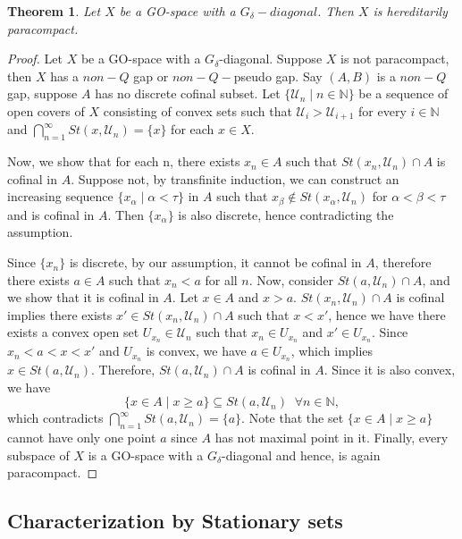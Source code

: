\documentclass[12pt,oneside,english]{amsbook}
\numberwithin{equation}{section} %
\numberwithin{figure}{section} %
\theoremstyle{plain}
\numberwithin{section}{chapter}
\newtheorem{thm}{Theorem}[section]
\theoremstyle{plain}
\begin{document}
\begin{thm}
  Let $X$ be a GO-space with a $G_{\delta}-diagonal$. Then $X$ is hereditarily paracompact.
\end{thm}
\begin{proof}
  Let $X$ be a GO-space with a $G_{\delta}$-diagonal. Suppose $X$ is not paracompact, then $X$ has a $non-Q$ gap or $non-Q-$pseudo gap. Say $(A,B)$ is a $non-Q$ gap, suppose $A$ has no discrete cofinal subset. Let $\{ \mathcal{U}_{n} \; | \; n \in \mathbb{N} \}$ be a sequence of open covers of $X$ consisting of convex sets such that $\mathcal{U}_{i} > \mathcal{U}_{i+1}$ for every $i \in \mathbb{N}$ and $\bigcap_{n = 1}^{\infty}St(x,\mathcal{U}_{n}) = \{x\}$ for each $x \in X$.

  Now, we show that for each n, there exists $x_{n} \in A$ such that $St(x_n,\mathcal{U}_{n}) \cap A$ is cofinal in $A$. Suppose not, by transfinite induction, we can construct an increasing sequence $\{x_{\alpha} \; | \; \alpha < \tau \}$ in $A$ such that $x_{\beta} \notin St(x_{\alpha},\mathcal{U}_{n})$ for $\alpha < \beta < \tau$ and is cofinal in $A$. Then $\{x_{\alpha}\}$ is also discrete, hence contradicting the assumption.

  Since $\{x_{n}\}$ is discrete, by our assumption, it cannot be cofinal in $A$, therefore there exists $a \in A$ such that $x_n < a$ for all $n$. Now, consider $St(a, \mathcal{U}_{n}) \cap A$, and we show that it is cofinal in $A$. Let $x \in A$ and $x > a$. $St(x_n, \mathcal{U}_{n}) \cap A$ is cofinal implies there exists $x' \in St(x_n, \mathcal{U}_{n}) \cap A$ such that $x < x'$, hence we have there exists a convex open set $U_{x_{n}} \in \mathcal{U}_{n}$ such that $x_n \in U_{x_{n}}$ and $x' \in U_{x_{n}}$. Since $x_{n} < a < x < x'$ and $U_{x_{n}}$ is convex, we have $a \in U_{x_{n}}$, which implies $x \in St(a, \mathcal{U}_{n})$. Therefore, $St(a, \mathcal{U}_{n}) \cap A$ is cofinal in $A$. Since it is also convex, we have $$ \{x \in A \; | \; x \geq a \} \subseteq St(a, \mathcal{U}_{n}) \; \; \forall n \in \mathbb{N},$$ which contradicts $\bigcap_{n =1}^{\infty}St(a,\mathcal{U}_{n}) = \{a\}$. Note that the set $\{x \in A \; | \; x \geq a \}$ cannot have only one point $a$ since $A$ has not maximal point in it. Finally, every subspace of $X$ is a GO-space with a $G_{\delta}$-diagonal and hence, is again paracompact.  
\end{proof}

\subsection{Characterization by Stationary sets}
\end{document}
